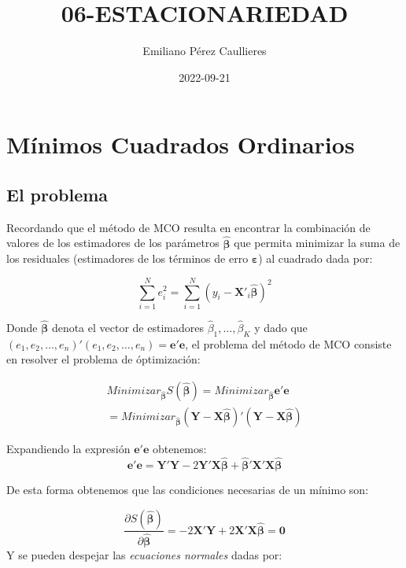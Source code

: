 \documentclass[
]{book}
\title{06-ESTACIONARIEDAD}
\author{Emiliano Pérez Caullieres}
\date{2022-09-21}
\begin{document}
\maketitle

{
\setcounter{tocdepth}{1}
\tableofcontents
}
\hypertarget{muxednimos-cuadrados-ordinarios}{%
\chapter{Mínimos Cuadrados Ordinarios}\label{muxednimos-cuadrados-ordinarios}}

\hypertarget{el-problema}{%
\section{El problema}\label{el-problema}}

Recordando que el método de MCO resulta en encontrar la combinación de valores de los estimadores de los parámetros \(\hat{\boldsymbol{\beta}}\) que permita minimizar la suma de los residuales (estimadores de los términos de erro \(\boldsymbol{\varepsilon}\)) al cuadrado dada por:

\[
    \sum^{N}_{i=1}{e^2_i} = \sum^{N}_{i = 1}{(y_i - \mathbf{X}'_i \hat{\boldsymbol{\beta}})^2}
\]

Donde \(\hat{\boldsymbol{\beta}}\) denota el vector de estimadores \(\hat{\beta}_1, \ldots, \hat{\beta}_K\) y dado que \((e_1, e_2, \ldots, e_n)'(e_1, e_2, \ldots, e_n) = {\mathbf{e'e}}\), el problema del método de MCO consiste en resolver el problema de óptimización:

\begin{eqnarray*}
Minimizar_{\hat{\boldsymbol \beta}} S(\hat{\boldsymbol \beta})  =  Minimizar_{\hat{\boldsymbol \beta}} \mathbf{e'e} \\
    =  Minimizar_{\hat{\boldsymbol \beta}} (\mathbf{Y}-\mathbf{X}\hat{\boldsymbol \beta})'(\mathbf{Y}-\mathbf{X}\hat{\boldsymbol \beta})
\end{eqnarray*}

Expandiendo la expresión \(\mathbf{e'e}\) obtenemos:
\[
    \mathbf{e'e} = \mathbf{Y'Y} - 2 \mathbf{Y'X} \hat{\boldsymbol \beta} + \hat{\boldsymbol \beta}' \mathbf{X'X}\hat{\boldsymbol \beta}
\]

De esta forma obtenemos que las condiciones necesarias de un mínimo son:

\[
    \frac{\partial S(\hat{\boldsymbol \beta})}{\partial \hat{\boldsymbol \beta}} = -2{\mathbf{X'Y}} + 2{\mathbf{X'X}} \hat{\boldsymbol{\beta}} = \mathbf{0}
\]
Y se pueden despejar las \textit{ecuaciones normales} dadas por:
\end{document}
